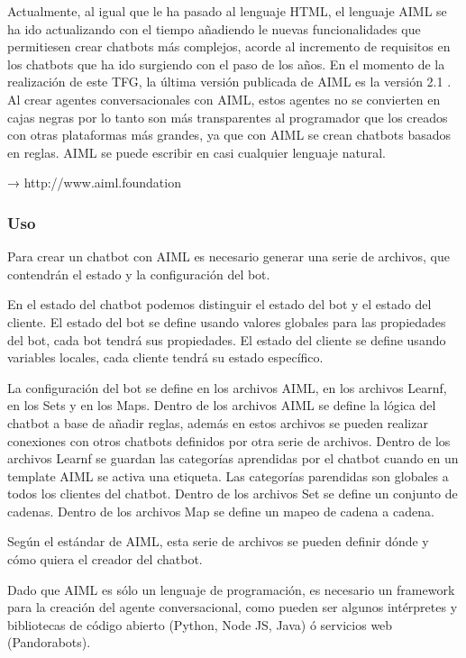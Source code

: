 Actualmente, al igual que le ha pasado al lenguaje HTML, el lenguaje AIML se ha ido actualizando con el tiempo añadiendo le nuevas funcionalidades que permitiesen crear chatbots más complejos, acorde al incremento de requisitos en los chatbots que ha ido surgiendo con el paso de los años. En el momento de la realización de este TFG, la última versión publicada de AIML es la versión 2.1 . Al crear agentes conversacionales con AIML, estos agentes no se convierten en cajas negras por lo tanto son más transparentes al programador que los creados con otras plataformas más grandes, ya que con AIML se crean chatbots basados en reglas. AIML se puede escribir en casi cualquier lenguaje natural.



→ http://www.aiml.foundation

\subsubsection*{Uso}

Para crear un chatbot con AIML es necesario generar una serie de archivos, que contendrán el estado y la configuración del bot.

En el estado del chatbot podemos distinguir el estado del bot y el estado del cliente. El estado del bot se define usando valores globales para las propiedades del bot, cada bot tendrá sus propiedades. El estado del cliente se define usando variables locales, cada cliente tendrá su estado específico.

La configuración del bot se define en los archivos AIML, en los archivos Learnf, en los Sets y en los Maps. Dentro de los archivos AIML se define la lógica del chatbot a base de añadir reglas, además en estos archivos se pueden realizar conexiones con otros chatbots definidos por otra serie de archivos. Dentro de los archivos Learnf se guardan las categorías aprendidas por el chatbot cuando en un template AIML se activa una etiqueta. Las categorías parendidas son globales a todos los clientes del chatbot. Dentro de los archivos Set se define un conjunto de cadenas. Dentro de los archivos Map se define un mapeo de cadena a cadena.

Según el estándar de AIML, esta serie de archivos se pueden definir dónde y cómo quiera el creador del chatbot.

Dado que AIML es sólo un lenguaje de programación, es necesario un framework para la creación del agente conversacional, como pueden ser algunos intérpretes y bibliotecas de código abierto (Python, Node JS, Java) ó servicios web (Pandorabots).

